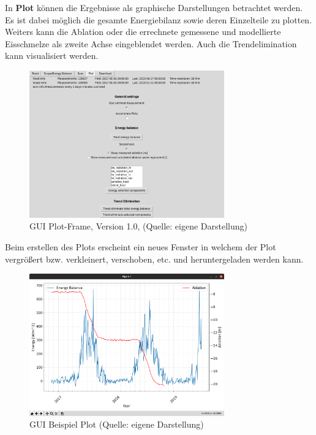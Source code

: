 \documentclass[11pt,a4paper]{article}
\newcommand{\guiplotsize}{0.75}
\newcommand{\guiversion}{1.0}
\begin{document}
In \textbf{Plot} können die Ergebnisse als graphische Darstellungen betrachtet werden. Es ist dabei möglich die gesamte Energiebilanz sowie deren Einzelteile zu plotten. Weiters kann die Ablation oder die errechnete gemessene und modellierte Eisschmelze als zweite Achse eingeblendet werden. Auch die Trendelimination kann visualisiert werden.

\begin{figure}[H]
\centering
\includegraphics[width=\guiplotsize\textwidth]{pictures/GUI/Plot_Frame.png}
\caption[GUI Plot-Frame, Version \guiversion]{GUI Plot-Frame, Version \guiversion, (Quelle: eigene Darstellung)}
\label{fig:GUI Plot-Frame}
\end{figure}

Beim erstellen des Plots erscheint ein neues Fenster in welchem der Plot vergrößert bzw. verkleinert, verschoben, etc. und heruntergeladen werden kann.

\begin{figure}[H]
\centering
\includegraphics[width=\guiplotsize\textwidth]{pictures/GUI/Sample_Plot.png}
\caption[GUI Beispiel Plot]{GUI Beispiel Plot (Quelle: eigene Darstellung)}
\label{fig:GUI Beispiel Plot}
\end{figure}
\end{document}
